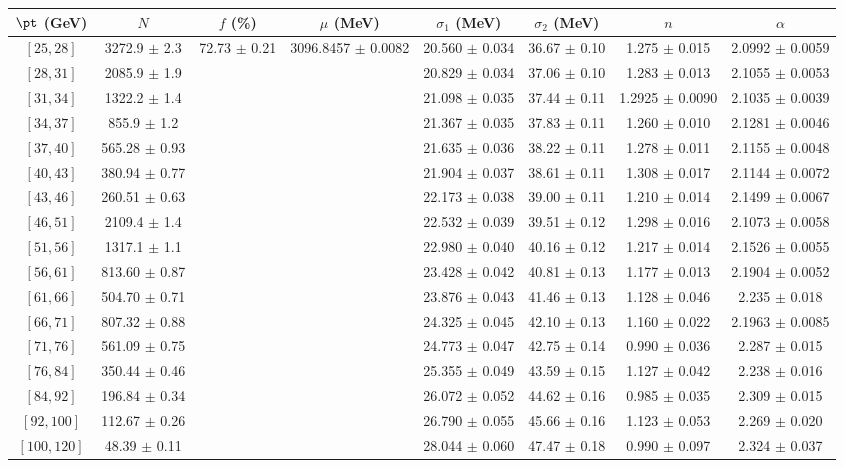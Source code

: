 \begin{tabular}{c||c|c|c|c|c|c|c}
$\pt$ (GeV) & $N$ & $f$ (\%) & $\mu$ (MeV) & $\sigma_1$ (MeV) & $\sigma_2$ (MeV) & $n$ & $\alpha$ \\
\hline
$[25, 28]$ & 3272.9 $\pm$ 2.3 & \multirow{17}{*}{72.73 $\pm$ 0.21} & \multirow{17}{*}{3096.8457 $\pm$ 0.0082} & 20.560 $\pm$ 0.034 & 36.67 $\pm$ 0.10 & 1.275 $\pm$ 0.015 & 2.0992 $\pm$ 0.0059\\
$[28, 31]$ & 2085.9 $\pm$ 1.9 &  &  & 20.829 $\pm$ 0.034 & 37.06 $\pm$ 0.10 & 1.283 $\pm$ 0.013 & 2.1055 $\pm$ 0.0053\\
$[31, 34]$ & 1322.2 $\pm$ 1.4 &  &  & 21.098 $\pm$ 0.035 & 37.44 $\pm$ 0.11 & 1.2925 $\pm$ 0.0090 & 2.1035 $\pm$ 0.0039\\
$[34, 37]$ & 855.9 $\pm$ 1.2 &  &  & 21.367 $\pm$ 0.035 & 37.83 $\pm$ 0.11 & 1.260 $\pm$ 0.010 & 2.1281 $\pm$ 0.0046\\
$[37, 40]$ & 565.28 $\pm$ 0.93 &  &  & 21.635 $\pm$ 0.036 & 38.22 $\pm$ 0.11 & 1.278 $\pm$ 0.011 & 2.1155 $\pm$ 0.0048\\
$[40, 43]$ & 380.94 $\pm$ 0.77 &  &  & 21.904 $\pm$ 0.037 & 38.61 $\pm$ 0.11 & 1.308 $\pm$ 0.017 & 2.1144 $\pm$ 0.0072\\
$[43, 46]$ & 260.51 $\pm$ 0.63 &  &  & 22.173 $\pm$ 0.038 & 39.00 $\pm$ 0.11 & 1.210 $\pm$ 0.014 & 2.1499 $\pm$ 0.0067\\
$[46, 51]$ & 2109.4 $\pm$ 1.4 &  &  & 22.532 $\pm$ 0.039 & 39.51 $\pm$ 0.12 & 1.298 $\pm$ 0.016 & 2.1073 $\pm$ 0.0058\\
$[51, 56]$ & 1317.1 $\pm$ 1.1 &  &  & 22.980 $\pm$ 0.040 & 40.16 $\pm$ 0.12 & 1.217 $\pm$ 0.014 & 2.1526 $\pm$ 0.0055\\
$[56, 61]$ & 813.60 $\pm$ 0.87 &  &  & 23.428 $\pm$ 0.042 & 40.81 $\pm$ 0.13 & 1.177 $\pm$ 0.013 & 2.1904 $\pm$ 0.0052\\
$[61, 66]$ & 504.70 $\pm$ 0.71 &  &  & 23.876 $\pm$ 0.043 & 41.46 $\pm$ 0.13 & 1.128 $\pm$ 0.046 & 2.235 $\pm$ 0.018\\
$[66, 71]$ & 807.32 $\pm$ 0.88 &  &  & 24.325 $\pm$ 0.045 & 42.10 $\pm$ 0.13 & 1.160 $\pm$ 0.022 & 2.1963 $\pm$ 0.0085\\
$[71, 76]$ & 561.09 $\pm$ 0.75 &  &  & 24.773 $\pm$ 0.047 & 42.75 $\pm$ 0.14 & 0.990 $\pm$ 0.036 & 2.287 $\pm$ 0.015\\
$[76, 84]$ & 350.44 $\pm$ 0.46 &  &  & 25.355 $\pm$ 0.049 & 43.59 $\pm$ 0.15 & 1.127 $\pm$ 0.042 & 2.238 $\pm$ 0.016\\
$[84, 92]$ & 196.84 $\pm$ 0.34 &  &  & 26.072 $\pm$ 0.052 & 44.62 $\pm$ 0.16 & 0.985 $\pm$ 0.035 & 2.309 $\pm$ 0.015\\
$[92, 100]$ & 112.67 $\pm$ 0.26 &  &  & 26.790 $\pm$ 0.055 & 45.66 $\pm$ 0.16 & 1.123 $\pm$ 0.053 & 2.269 $\pm$ 0.020\\
$[100, 120]$ & 48.39 $\pm$ 0.11 &  &  & 28.044 $\pm$ 0.060 & 47.47 $\pm$ 0.18 & 0.990 $\pm$ 0.097 & 2.324 $\pm$ 0.037\\
\end{tabular}
